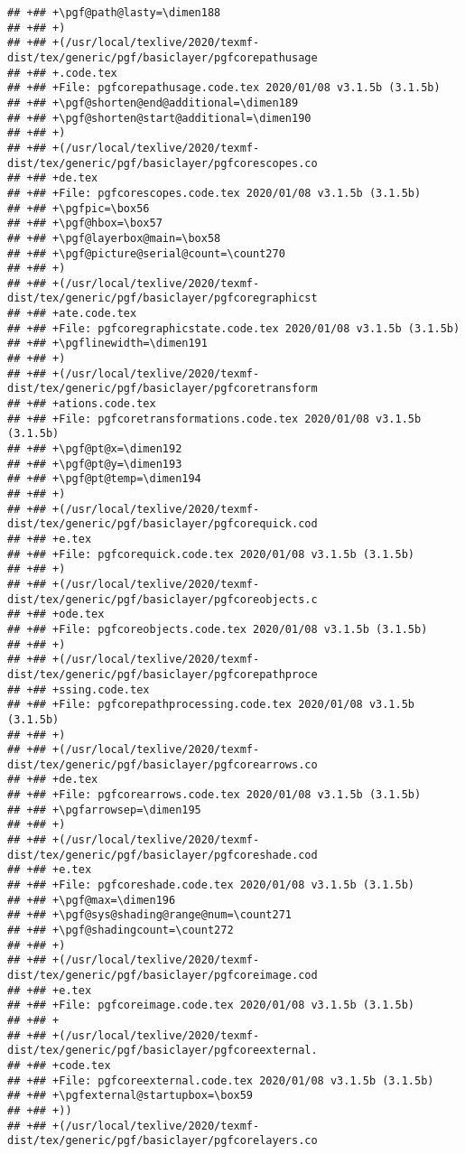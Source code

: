 \documentclass[ignorenonframetext,]{beamer}
\begin{document}
\begin{verbatim}
## +## +\pgf@path@lasty=\dimen188
## +## +)
## +## +(/usr/local/texlive/2020/texmf-dist/tex/generic/pgf/basiclayer/pgfcorepathusage
## +## +.code.tex
## +## +File: pgfcorepathusage.code.tex 2020/01/08 v3.1.5b (3.1.5b)
## +## +\pgf@shorten@end@additional=\dimen189
## +## +\pgf@shorten@start@additional=\dimen190
## +## +)
## +## +(/usr/local/texlive/2020/texmf-dist/tex/generic/pgf/basiclayer/pgfcorescopes.co
## +## +de.tex
## +## +File: pgfcorescopes.code.tex 2020/01/08 v3.1.5b (3.1.5b)
## +## +\pgfpic=\box56
## +## +\pgf@hbox=\box57
## +## +\pgf@layerbox@main=\box58
## +## +\pgf@picture@serial@count=\count270
## +## +)
## +## +(/usr/local/texlive/2020/texmf-dist/tex/generic/pgf/basiclayer/pgfcoregraphicst
## +## +ate.code.tex
## +## +File: pgfcoregraphicstate.code.tex 2020/01/08 v3.1.5b (3.1.5b)
## +## +\pgflinewidth=\dimen191
## +## +)
## +## +(/usr/local/texlive/2020/texmf-dist/tex/generic/pgf/basiclayer/pgfcoretransform
## +## +ations.code.tex
## +## +File: pgfcoretransformations.code.tex 2020/01/08 v3.1.5b (3.1.5b)
## +## +\pgf@pt@x=\dimen192
## +## +\pgf@pt@y=\dimen193
## +## +\pgf@pt@temp=\dimen194
## +## +)
## +## +(/usr/local/texlive/2020/texmf-dist/tex/generic/pgf/basiclayer/pgfcorequick.cod
## +## +e.tex
## +## +File: pgfcorequick.code.tex 2020/01/08 v3.1.5b (3.1.5b)
## +## +)
## +## +(/usr/local/texlive/2020/texmf-dist/tex/generic/pgf/basiclayer/pgfcoreobjects.c
## +## +ode.tex
## +## +File: pgfcoreobjects.code.tex 2020/01/08 v3.1.5b (3.1.5b)
## +## +)
## +## +(/usr/local/texlive/2020/texmf-dist/tex/generic/pgf/basiclayer/pgfcorepathproce
## +## +ssing.code.tex
## +## +File: pgfcorepathprocessing.code.tex 2020/01/08 v3.1.5b (3.1.5b)
## +## +)
## +## +(/usr/local/texlive/2020/texmf-dist/tex/generic/pgf/basiclayer/pgfcorearrows.co
## +## +de.tex
## +## +File: pgfcorearrows.code.tex 2020/01/08 v3.1.5b (3.1.5b)
## +## +\pgfarrowsep=\dimen195
## +## +)
## +## +(/usr/local/texlive/2020/texmf-dist/tex/generic/pgf/basiclayer/pgfcoreshade.cod
## +## +e.tex
## +## +File: pgfcoreshade.code.tex 2020/01/08 v3.1.5b (3.1.5b)
## +## +\pgf@max=\dimen196
## +## +\pgf@sys@shading@range@num=\count271
## +## +\pgf@shadingcount=\count272
## +## +)
## +## +(/usr/local/texlive/2020/texmf-dist/tex/generic/pgf/basiclayer/pgfcoreimage.cod
## +## +e.tex
## +## +File: pgfcoreimage.code.tex 2020/01/08 v3.1.5b (3.1.5b)
## +## +
## +## +(/usr/local/texlive/2020/texmf-dist/tex/generic/pgf/basiclayer/pgfcoreexternal.
## +## +code.tex
## +## +File: pgfcoreexternal.code.tex 2020/01/08 v3.1.5b (3.1.5b)
## +## +\pgfexternal@startupbox=\box59
## +## +))
## +## +(/usr/local/texlive/2020/texmf-dist/tex/generic/pgf/basiclayer/pgfcorelayers.co

\end{verbatim}
\end{document}
